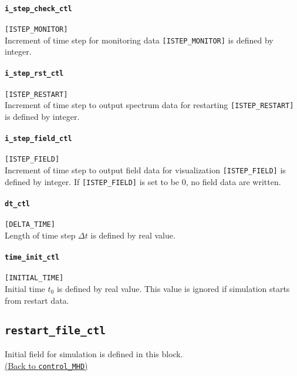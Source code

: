 \paragraph{\tt i\_step\_check\_ctl}
\label{href_t:i_step_check_ctl}
\verb|[ISTEP_MONITOR]| \\
Increment of time step for monitoring data \verb|[ISTEP_MONITOR]| is defined by integer.

\paragraph{\tt i\_step\_rst\_ctl}
\label{href_t:i_step_rst_ctl}
\verb|[ISTEP_RESTART]| \\
Increment of time step to output spectrum data for restarting \verb|[ISTEP_RESTART]| is defined by integer.

\paragraph{\tt i\_step\_field\_ctl}
\label{href_t:i_step_field_ctl}
\verb|[ISTEP_FIELD]| \\
Increment of time step to output field data for visualization \verb|[ISTEP_FIELD]| is defined by integer. If \verb|[ISTEP_FIELD]| is set to be 0, no field data are written.

\paragraph{\tt dt\_ctl}
\label{href_t:dt_ctl}
\verb|[DELTA_TIME]| \\
Length of time step $\Delta t$ is defined by real value.

\paragraph{\tt time\_init\_ctl}
\label{href_t:time_init_ctl}
\verb|[INITIAL_TIME]| \\
Initial time $t_{0}$ is defined by real value. This value is ignored if simulation starts from restart data.


\subsection{\tt restart\_file\_ctl}
\label{href_t:restart_file_ctl}
Initial field for simulation is defined in this block.\\
\hyperref[href_t:restart_file_prefix]{(Back to {\tt control\_MHD})}

